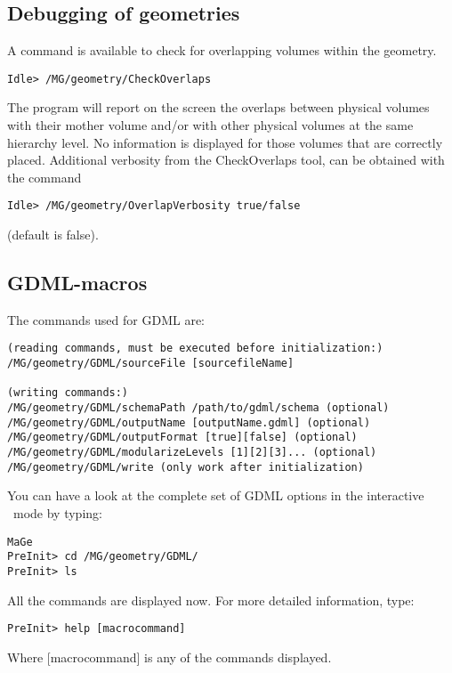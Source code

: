 \subsection{Debugging of geometries}
A command is available to check for overlapping volumes within the geometry.
\begin{lstlisting}
Idle> /MG/geometry/CheckOverlaps
\end{lstlisting}
The program will report on the screen the overlaps between physical volumes with their mother
volume and/or with other physical volumes at the same hierarchy level. No information is 
displayed for those volumes that are correctly placed. Additional verbosity from the 
CheckOverlaps tool, can be obtained with the command
\begin{lstlisting}
Idle> /MG/geometry/OverlapVerbosity true/false
\end{lstlisting}
(default is false).

\subsection{GDML-macros} \label{subsection:GDML-macros}

The commands used for GDML are:
\begin{lstlisting}
(reading commands, must be executed before initialization:)
/MG/geometry/GDML/sourceFile [sourcefileName]

(writing commands:)
/MG/geometry/GDML/schemaPath /path/to/gdml/schema (optional)
/MG/geometry/GDML/outputName [outputName.gdml] (optional)
/MG/geometry/GDML/outputFormat [true][false] (optional)
/MG/geometry/GDML/modularizeLevels [1][2][3]... (optional)
/MG/geometry/GDML/write (only work after initialization)
\end{lstlisting}
You can have a look at the complete set of GDML options in the interactive \mage \ mode by typing:\\
\begin{lstlisting}
MaGe
PreInit> cd /MG/geometry/GDML/
PreInit> ls
\end{lstlisting}
All the commands are displayed now. For more detailed information, type:
\begin{lstlisting}
PreInit> help [macrocommand]
\end{lstlisting}
Where [macrocommand] is any of the commands displayed.\\

